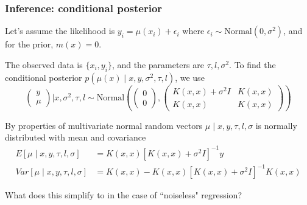 \documentclass{beamer}
\begin{document}
\begin{frame}
\frametitle{Inference: conditional posterior}


Let's assume the likelihood is $y_i = \mu(x_i) + \epsilon_i$ where $\epsilon_i \sim \text{Normal}(0,\sigma^2)$, and for the prior, $m(x) = 0$. 
\newline

The observed data is $\{x_i,y_i\}$, and the parameters are $\tau, l, \sigma^2$. To find the conditional posterior $p(\mu(x) \mid x,y,\sigma^2, \tau, l)$, we use
$$
\left(\begin{array}{c}
y \\
\mu
\end{array}\right) 
\bigg\rvert x, \sigma^2, \tau, l
\sim \text{Normal}\left(
\left(\begin{array}{c}
0\\
0
\end{array}\right),
\left(\begin{array}{cc}
K(x,x) + \sigma^2 I & K(x,x)\\
K(x,x) & K(x,x)
\end{array}\right)
\right)
$$
\pause

By properties of multivariate normal random vectors $\mu \mid x, y, \tau, l, \sigma$ is normally distributed with mean and covariance
\begin{align*}
E[\mu \mid x, y, \tau, l, \sigma] &= K(x, x) [K(x,x) + \sigma^2 I]^{-1} y \\
Var[\mu \mid x, y, \tau, l, \sigma] &= K(x, x) - K(x, x)[K(x,x) + \sigma^2 I]^{-1} K(x,x)
\end{align*}
\pause

What does this simplify to in the case of ``noiseless" regression?

\end{frame}
\end{document}

